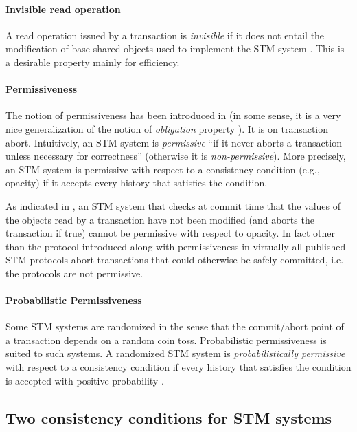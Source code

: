 \paragraph{Invisible read operation}
A read operation issued by a transaction is {\it invisible} if it does 
not entail the modification of base shared objects used to implement 
the STM system  \cite{MSHAESS06}.
This is a desirable property mainly for efficiency. 


\paragraph{Permissiveness}
The  notion  of permissiveness  has been introduced in  \cite{GHS08}
(in some sense,  it is a  very  nice generalization of the notion  of  
{\it obligation} property \cite{IR09-a}). It is on  transaction abort. 
Intuitively, an STM system is {\it permissive}  ``if it  never aborts a 
transaction unless necessary for  correctness'' (otherwise it is 
{\it non-permissive}).  More precisely, 
an STM system is permissive with respect to a consistency condition 
(e.g., opacity) if  it accepts  every history that satisfies the condition. 

As indicated in \cite{GHS08}, an STM system that checks at commit time that
the values of the objects read by a transaction have not been modified (and 
aborts the transaction if true) cannot be permissive  with respect to opacity. 
In fact other than the protocol introduced along with permissiveness in \cite{GHS08}
virtually all published STM protocols abort transactions that could
otherwise be safely committed, i.e. the protocols are not permissive.


\paragraph{Probabilistic Permissiveness}
Some STM systems are randomized in the sense that the commit/abort point of
a transaction depends on  a random coin toss. Probabilistic permissiveness is
suited to  such systems. A  randomized STM system is  {\it probabilistically
permissive} with respect to a  consistency condition if every history that
satisfies the condition is accepted with positive probability \cite{GHS08}. 



\subsection{Two consistency conditions  for STM systems}

